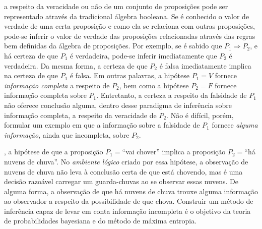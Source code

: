  a respeito da veracidade ou não de um conjunto de proposições pode ser representado através da tradicional álgebra booleana. Se é conhecido o valor de verdade de uma certa proposição e como ela se relaciona com outras proposições, pode-se inferir o valor de verdade das proposições relacionadas através das regras bem definidas da álgebra de proposições. Por exemplo, se é sabido que $P_{1} \Rightarrow P_{2}$, e há certeza de que $P_{1}$ é verdadeira, pode-se inferir imediatamente que $P_{2}$ é verdadeira. Da mesma forma, a certeza de que $P_{2}$ é falsa imediatamente implica na certeza de que $P_{1}$ é falsa. Em outras palavras, a hipótese $P_{1} = V$ fornece \textit{informação completa} a respeito de $P_{2}$, bem como a hipótese $P_{2} = F$ fornece informação completa sobre $P_1$. Entretanto, a certeza a respeito da falsidade de $P_{1}$ não oferece conclusão alguma, dentro desse paradigma de inferência sobre informação completa, a respeito da veracidade de $P_{2}$. Não é difícil, porém, formular um exemplo em que a informação sobre a falsidade de $P_{1}$ fornece \textit{alguma informação}, ainda que incompleta, sobre $P_{2}$. 

, a hipótese de que a proposição $P_{1} = $``vai chover'' implica a proposição $P_{2} =$``há nuvens de chuva''. No \textit{ambiente lógico} criado por essa hipótese, a observação de nuvens de chuva não leva à conclusão certa de que está chovendo, mas é uma decisão razoável carregar um guarda-chuvas ao se observar essas nuvens. De alguma forma, a observação de que há nuvens de chuva trouxe alguma informação ao observador a respeito da possibilidade de que chova. Construir um método de inferência capaz de levar em conta informação incompleta é o objetivo da teoria de probabilidades bayesiana e do método de máxima entropia. 

